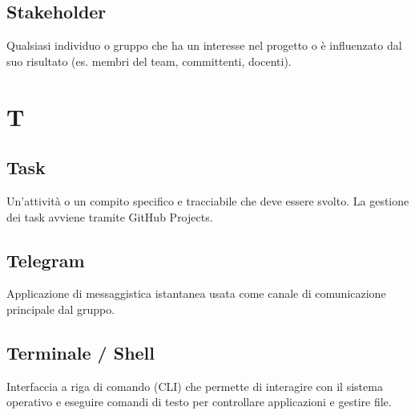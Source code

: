 \documentclass[a4paper, 11pt, oneside]{scrartcl} %
\begin{document}
\subsection*{Stakeholder}


Qualsiasi individuo o gruppo che ha un interesse nel progetto o è influenzato dal suo risultato (es. membri del team, committenti, docenti).

\vspace{0.5cm}


\section*{T}


\subsection*{Task}


Un'attività o un compito specifico e tracciabile che deve essere svolto. La gestione dei task avviene tramite GitHub Projects.

\vspace{0.5cm}

\subsection*{Telegram}


Applicazione di messaggistica istantanea usata come canale di comunicazione principale dal gruppo.

\vspace{0.5cm}

\subsection*{Terminale / Shell}


Interfaccia a riga di comando (CLI) che permette di interagire con il sistema operativo e eseguire comandi di testo per controllare applicazioni e gestire file.

\vspace{0.5cm}
\end{document}
